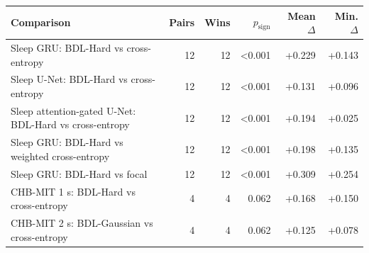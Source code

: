 \begin{tabular}{lrrrrr}
\toprule
Comparison & Pairs & Wins & $p_{\mathrm{sign}}$ & Mean $\Delta$ & Min. $\Delta$ \\
\midrule
Sleep GRU: BDL-Hard vs cross-entropy & 12 & 12 & <0.001 & +0.229 & +0.143 \\
Sleep U-Net: BDL-Hard vs cross-entropy & 12 & 12 & <0.001 & +0.131 & +0.096 \\
Sleep attention-gated U-Net: BDL-Hard vs cross-entropy & 12 & 12 & <0.001 & +0.194 & +0.025 \\
Sleep GRU: BDL-Hard vs weighted cross-entropy & 12 & 12 & <0.001 & +0.198 & +0.135 \\
Sleep GRU: BDL-Hard vs focal & 12 & 12 & <0.001 & +0.309 & +0.254 \\
CHB-MIT 1 s: BDL-Hard vs cross-entropy & 4 & 4 & 0.062 & +0.168 & +0.150 \\
CHB-MIT 2 s: BDL-Gaussian vs cross-entropy & 4 & 4 & 0.062 & +0.125 & +0.078 \\
\bottomrule
\end{tabular}
